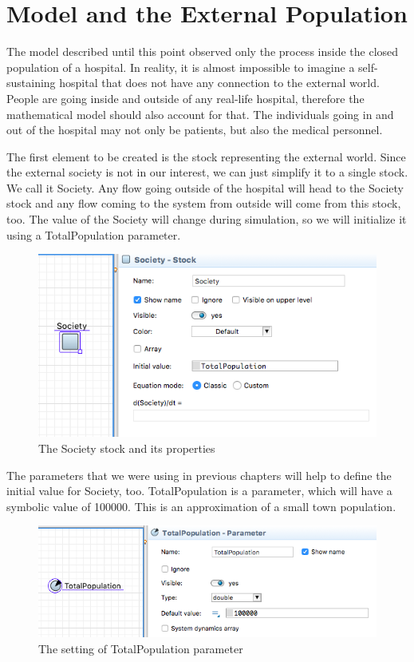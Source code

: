 \section{Model and the External Population}

The model described until this point observed only the process inside the closed population of a hospital. In reality, it is almost impossible to imagine a self-sustaining hospital that does not have any connection to the external world. People are going inside and outside of any real-life hospital, therefore the mathematical model should also account for that. The individuals going in and out of the hospital may not only be patients, but also the medical personnel.

The first element to be created is the stock representing the external world. Since the external society is not in our interest, we can just simplify it to a single stock. We call it Society. Any flow going outside of the hospital will head to the Society stock and any flow coming to the system from outside will come from this stock, too. The value of the Society will change during simulation, so we will initialize it using a TotalPopulation parameter.

\begin{figure}[H]
  \centering
  \includegraphics[height=0.3\textwidth]{img/screens/society/society1}
  \caption{The Society stock and its properties}
\end{figure}

The parameters that we were using in previous chapters will help to define the initial value for Society, too. TotalPopulation is a parameter, which will have a symbolic value of 100000. This is an approximation of a small town population.

\begin{figure}[H]
  \centering
  \includegraphics[height=0.3\textwidth]{img/screens/society/society2}
  \caption{The setting of TotalPopulation parameter}
\end{figure}

